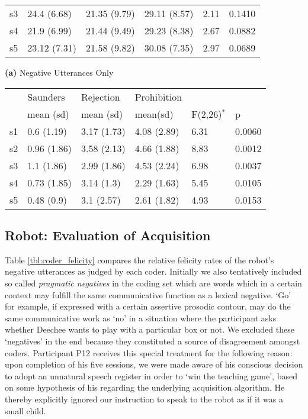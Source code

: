 \begin{screenonly}
\begin{table}[h]
\begin{tabular}{llllll}
    s3 & 24.4 (6.68) & 21.35 (9.79) & 29.11 (8.57) & 2.11 & 0.1410\\
    s4 & 21.9 (6.99) & 21.44 (9.49) & 29.23 (8.38) & 2.67 & 0.0882\\
    s5 & 23.12 (7.31) & 21.58 (9.82) & 30.08 (7.35) & 2.97 & 0.0689\\
    \bottomrule
  \end{tabular}
  \begin{minipage}[t][1cm][t]{9.5cm}
    \vspace*{2ex}
    {\small\textbf{(a)} Negative Utterances Only}\\
  \end{minipage}
  \begin{tabular}{llllll}
    \toprule
    & Saunders & Rejection & Prohibition \\
    & mean (sd) & mean (sd) & mean(sd) & F(2,26)$^*$ & p \\
    \midrule
    s1 & 0.6 (1.19) & 3.17 (1.73) & 4.08 (2.89) & 6.31 & 0.0060\\
    s2 & 0.96 (1.86) & 3.58 (2.13) & 4.66 (1.88) & 8.83 & 0.0012\\
    s3 & 1.1 (1.86) & 2.99 (1.86) & 4.53 (2.24) & 6.98 & 0.0037\\
    s4 & 0.73 (1.85) & 3.14 (1.3) & 2.29 (1.63) & 5.45 & 0.0105\\
    s5 & 0.48 (0.9) & 3.1 (2.57) & 2.61 (1.82) & 4.93 & 0.0153\\
    \bottomrule
  \end{tabular}
\end{table}

\subsection{Robot: Evaluation of Acquisition}
Table \ref{tbl:coder_felicity} compares the relative felicity rates of the robot's negative utterances as judged by each coder. Initially we also
tentatively included so called \emph{pragmatic negatives} in the coding set which are words which in a certain context may fulfill the same communicative function
as a lexical negative. `Go' for example, if expressed with a certain assertive prosodic contour, may do the same communicative work as `no' in a situation where
the participant asks whether Deechee wants to play with a particular box or not. We excluded these `negatives' in the end because they constituted a source of
disagreement amongst coders. Participant P12 receives this special treatment for the following reason: upon completion of his five sessions, we were made aware of
his conscious decision to adopt an unnatural speech register in order to `win the teaching game', based on some hypothesis of his regarding the underlying acquisition
algorithm. He thereby explicitly ignored our instruction to speak to the robot as if it was a small child.


\end{screenonly}
